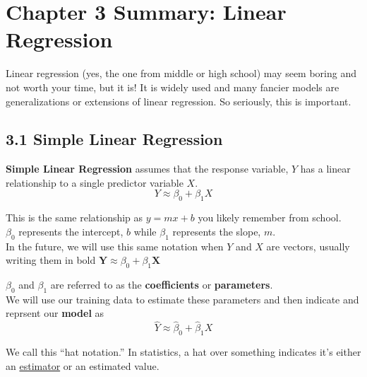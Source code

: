 

    \section*{Chapter 3 Summary: Linear Regression}\label{chapter-3-summary-linear-regression}
        Linear regression (yes, the one from middle or high school) may seem boring and not worth your time, but it is! 
        It is widely used and many    fancier models are generalizations or extensions of linear regression.    So seriously, this is important.
        \subsection*{3.1 Simple Linear Regression}
        \textbf{Simple Linear Regression} assumes that the response variable, \(Y\) has a linear relationship to a single predictor variable \(X\).
        \begin{equation*}
            Y \approx \beta_0 + \beta_1 X
        \end{equation*}
        
        
        \begin{note}
            This is the same relationship as \(y=mx+b\) you likely remember from school.\\
            \(\beta_0\) represents the intercept, \(b\) while \(\beta_1\) represents the slope, \(m\).\\
            In the future, we will use this same notation when \(Y\) and \(X\) are vectors, usually writing them in bold \(\mathbf{Y} \approx \beta_0 + \beta_1 \mathbf{X}\)
        \end{note}
        
        \(\beta_0\) and \(\beta_1\) are referred to as the \textbf{coefficients} or \textbf{parameters}.\\
        We will use our training data to estimate these parameters and then indicate and reprsent our \textbf{model} as
        \begin{equation*}
            \hat Y \approx \hat \beta_0 + \hat \beta_1 X
        \end{equation*}

        \begin{note}
            We call this ``hat notation.'' In statistics, a hat over something indicates it's either an
            \href{https://en.wikipedia.org/wiki/Estimator}{estimator} or an estimated value.
        \end{note}
        
